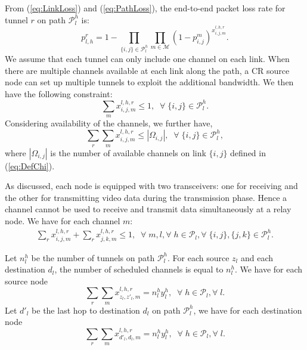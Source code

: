 \documentclass[12pt,onecolumn,draftclsnofoot]{IEEEtran} %
\begin{document}
From (\ref{eq:LinkLoss}) and (\ref{eq:PathLoss}), the end-to-end packet loss rate for tunnel $r$ on path $\mathcal{P}_l^h$ is:
\begin{equation}\label{eq:StrmLoss}
  p_{l,h}^r = 1 - \prod_{\{i,j\} \in \mathcal{P}_l^h} 
          \prod_{m \in \mathcal{M}}
          (1-p_{i,j}^m)^{x_{i,j,m}^{l,h,r}} .
\end{equation}
We assume that each tunnel can only include one channel on each link. When there are multiple channels available at each link along the path, a CR source node can set up multiple tunnels to exploit the additional bandwidth. We then have the following constraint:
\begin{equation}\label{eq:OneChan1}
  \sum_m x_{i,j,m}^{l,h,r} \le 1, \;\; \forall \; \{i,j\} \in \mathcal{P}_l^h.
\end{equation}
Considering availability of the channels, we further have,
\begin{equation}\label{eq:AvailChan}
  \sum_r\sum_m x_{i,j,m}^{l,h,r} \le |\Omega_{i,j}|, \;\; \forall \; \{i,j\} \in \mathcal{P}_l^h,
\end{equation}
where $|\Omega_{i,j}|$ is the number of available channels on link $\{i,j\}$ defined in (\ref{eq:DefChi}).

As discussed, each node is equipped with two transceivers: one for receiving and the other for transmitting video data during the transmission phase.  Hence a channel cannot be used to receive and transmit data simultaneously at a relay node.  We have for each channel $m$:
\begin{eqnarray}\label{eq:HalfDuplex}
  \sum_r x_{i,j,m}^{l,h,r} + \sum_r x_{j,k,m}^{l,h,r} \le 1, \;\; 
  \forall \; m, l, \forall \; h \in \mathcal{P}_l, \forall \; \{i,j\} ,\{j,k\} \in \mathcal{P}_l^h. 
\end{eqnarray}

Let $n_l^h$ be the number of tunnels on path $\mathcal{P}_l^h$.  For each source $z_l$ and each destination $d_l$, the number of scheduled channels is equal to $n_l^h$.  We have for each source node
\begin{equation}\label{eq:SrcDstFlow}
  \sum_r\sum_m x_{z_l,z'_l,m}^{l,h,r}=n_l^h y_l^h, \;\; \forall \; h \in \mathcal{P}_l, \forall \; l.
\end{equation}
Let $d'_l$ be the last hop to destination $d_l$ on path $\mathcal{P}_l^h$, we have for each destination node
\begin{equation}\label{eq:DstFlow}
  \sum_r\sum_m x_{d'_l,d_l,m}^{l,h,r}=n_l^h y_l^h, \;\; \forall \; h \in \mathcal{P}_l, \forall \; l.
\end{equation}
\end{document}
